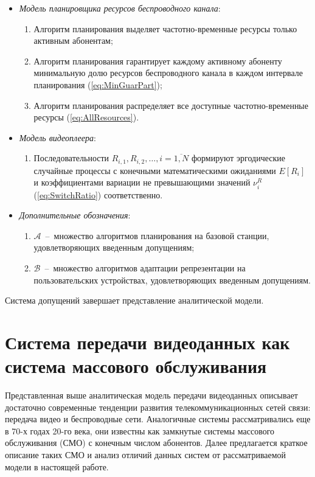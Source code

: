 \begin{itemize}
\begin{enumerate}
		\end{enumerate}
	\item \textit{Модель планировщика ресурсов беспроводного канала}:
		\begin{enumerate}
			\item Алгоритм планирования выделяет частотно-временные ресурсы только активным абонентам;
			\item Алгоритм планирования гарантирует каждому активному абоненту минимальную долю ресурсов беспроводного канала в каждом интервале планирования (\ref{eq:MinGuarPart});
			\item Алгоритм планирования распределяет все доступные частотно-временные ресурсы (\ref{eq:AllResources}).
		\end{enumerate}
	\item \textit{Модель видеоплеера}:
		\begin{enumerate}
			\item Последовательности $R_{i,1}, R_{i,2}, \ldots, i=\overline{1,N}$ формируют эргодические случайные процессы с конечными математическими ожиданиями $E[R_{i}]$ и коэффициентами вариации не превышающими значений $\nu^R_i$ (\ref{eq:SwitchRatio}) соответственно.
		\end{enumerate}
  \item \textit{Дополнительные обозначения}:
  \begin{enumerate}
  \item $\mathcal{A}$~--~множество алгоритмов планирования на базовой станции, удовлетворяющих введенным допущениям;
  \item $\mathcal{B}$~--~множество алгоритмов адаптации репрезентации на пользовательских устройствах, удовлетворяющих введенным допущениям.
  \end{enumerate}
\end{itemize}
Система допущений завершает представление аналитической модели.

\section{Система передачи видеоданных как система массового обслуживания}
\label{chap2:QueuningNetwork}

Представленная выше аналитическая модель передачи видеоданных описывает достаточно современные тенденции развития телекоммуникационных сетей связи: передача видео и беспроводные сети. Аналогичные системы рассматривались еще в 70-х годах 20-го века, они известны как замкнутые системы массового обслуживания (СМО) с конечным числом абонентов. Далее предлагается краткое описание таких СМО и анализ отличий данных систем от рассматриваемой модели в настоящей работе.

